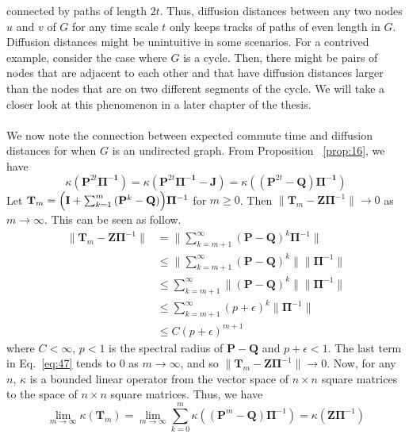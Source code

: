 connected by paths of length $2t$. Thus, diffusion distances between
any two nodes $u$ and $v$ of $G$ for any time scale $t$ only keeps
tracks of paths of even length in $G$. Diffusion distances might
be unintuitive in some scenarios. For a contrived example,
consider the case where $G$ is a cycle. Then, there might be pairs of nodes that are
adjacent to each other and that have diffusion distances larger than
the nodes that are on two different segments of the cycle. We will
take a closer look at this phenomenon in a later chapter of the
thesis. \\ \\
%
\noindent
We now note the connection between expected commute time and diffusion
distances for when $G$ is an undirected graph. From Proposition
~\ref{prop:16}, we have
\begin{equation}
  \label{eq:49}
\kappa(\mathbf{P}^{2t}\bm{\Pi^{-1}}) =
\kappa(\mathbf{P}^{2t}\bm{\Pi^{-1}} - \mathbf{J}) =
\kappa((\mathbf{P}^{2t} - \mathbf{Q}) \bm{\Pi^{-1}})
\end{equation}
Let $\mathbf{T}_{m} = \Bigl(\mathbf{I} + \sum_{k =
  1}^{m}{(\mathbf{P}^{k} - \mathbf{Q})}\Bigr)\bm{\Pi}^{-1}$ for $m
\geq 0$. Then $\| \mathbf{T}_m - \mathbf{Z}\bm{\Pi}^{-1} \| \rightarrow 0$ as
$m \rightarrow \infty$. This can be seen as follow. 
\begin{equation}
  \label{eq:47}
  \begin{split}
  \| \mathbf{T}_m - \mathbf{Z}\bm{\Pi}^{-1} \| &=
  \|\sum_{k=m+1}^{\infty}(\mathbf{P} - \mathbf{Q})^{k}\bm{\Pi}^{-1}
    \| \\
   &\leq \| \sum_{k=m+1}^{\infty}(\mathbf{P} - \mathbf{Q})^{k} \|
   \|\bm{\Pi}^{-1} \| \\
   &\leq \sum_{k=m+1}^{\infty} \|(\mathbf{P} - \mathbf{Q})^{k} \|
   \|\bm{\Pi}^{-1} \| \\
   &\leq \sum_{k=m+1}^{\infty} (p+\epsilon)^{k} \| \bm{\Pi}^{-1} \| \\
   &\leq C (p+\epsilon)^{m+1}
  \end{split}
\end{equation}
where $C < \infty$, $p < 1$ is the spectral radius of $\mathbf{P} -
\mathbf{Q}$ and $p + \epsilon < 1$. The last term in Eq.~\eqref{eq:47}
tends to $0$ as $m \rightarrow \infty$, and so $\| \mathbf{T}_m -
\mathbf{Z}\bm{\Pi}^{-1} \| \rightarrow 0$. Now, for any $n$, $\kappa$
is a bounded linear operator from the vector space of $n \times n$
square matrices to the space of $n \times n$ square matrices. Thus, we
have
\begin{equation}
  \label{eq:50}
  \lim_{m \rightarrow \infty}\kappa(\mathbf{T}_m) = \lim_{m \rightarrow \infty}
  \sum_{k=0}^{m}{\kappa((\mathbf{P}^{m} - \mathbf{Q})\bm{\Pi}^{-1})} =
    \kappa(\mathbf{Z}\bm{\Pi}^{-1})
\end{equation}
